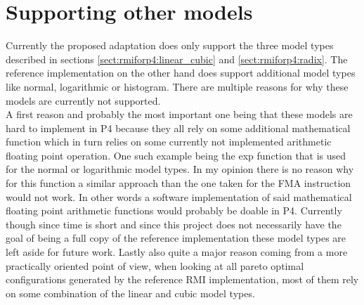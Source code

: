 \section{Supporting other models}
Currently the proposed adaptation does only support the three model types described in sections \ref{sect:rmiforp4:linear_cubic} and \ref{sect:rmiforp4:radix}. The reference implementation on the other hand does support additional model types like normal, logarithmic or histogram. There are multiple reasons for why these models are currently not supported.\\

A first reason and probably the most important one being that these models are hard to implement in P4 because they all rely on some additional mathematical function which in turn relies on some currently not implemented arithmetic floating point operation. One such example being the exp function that is used for the normal or logarithmic model types. In my opinion there is no reason why for this function a similar approach than the one taken for the FMA instruction would not work. In other words a software implementation of said mathematical floating point arithmetic functions would probably be doable in P4. Currently though since time is short and since this project does not necessarily have the goal of being a full copy of the reference implementation these model types are left aside for future work. Lastly also quite a major reason coming from a more practically oriented point of view, when looking at all pareto optimal configurations generated by the reference RMI implementation, most of them rely on some combination of the linear and cubic model types.
